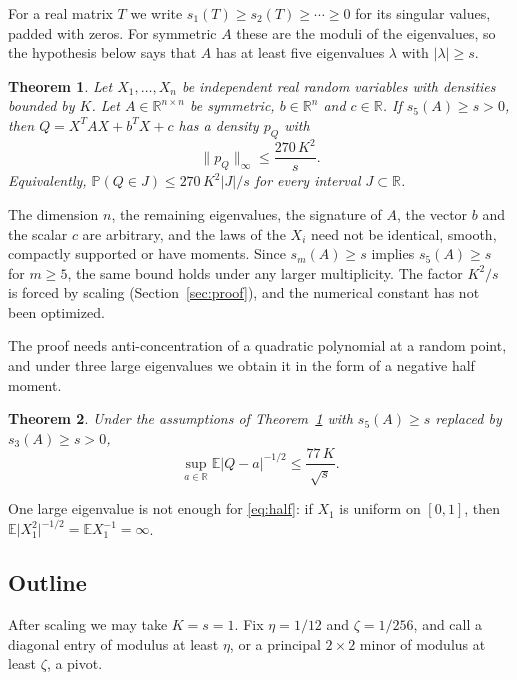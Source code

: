 \documentclass[11pt]{amsart}
\numberwithin{equation}{section}
\newtheorem{theorem}{Theorem}[section]
\theoremstyle{definition}
\theoremstyle{remark}
\newcommand{\R}{\mathbb R}
\newcommand{\E}{\mathbb E}
\newcommand{\PP}{\mathbb P}
\newcommand{\1}{\mathbf 1}
\newcommand{\norm}[1]{\lVert #1\rVert}
\newcommand{\abs}[1]{\lvert #1\rvert}
\begin{document}
For a real matrix $T$ we write $s_1(T)\ge s_2(T)\ge\cdots\ge0$ for its singular values, padded with zeros. For symmetric $A$ these are the moduli of the eigenvalues, so the hypothesis below says that $A$ has at least five eigenvalues $\lambda$ with $\abs\lambda\ge s$.

\begin{theorem}\label{thm:main}
Let $X_1,\dots,X_n$ be independent real random variables with densities bounded by $K$. Let $A\in\R^{n\times n}$ be symmetric, $b\in\R^n$ and $c\in\R$. If $s_5(A)\ge s>0$, then $Q=X^TAX+b^TX+c$ has a density $p_Q$ with
\begin{equation}\label{eq:main}
\norm{p_Q}_\infty\le \frac{270\,K^2}{s}.
\end{equation}
Equivalently, $\PP(Q\in J)\le 270\,K^2\abs J/s$ for every interval $J\subset\R$.
\end{theorem}

The dimension $n$, the remaining eigenvalues, the signature of $A$, the vector $b$ and the scalar $c$ are arbitrary, and the laws of the $X_i$ need not be identical, smooth, compactly supported or have moments. Since $s_m(A)\ge s$ implies $s_5(A)\ge s$ for $m\ge5$, the same bound holds under any larger multiplicity. The factor $K^2/s$ is forced by scaling (Section~\ref{sec:proof}), and the numerical constant has not been optimized.

The proof needs anti-concentration of a quadratic polynomial at a random point, and under three large eigenvalues we obtain it in the form of a negative half moment.

\begin{theorem}\label{thm:half}
Under the assumptions of Theorem~\ref{thm:main} with $s_5(A)\ge s$ replaced by $s_3(A)\ge s>0$,
\begin{equation}\label{eq:half}
\sup_{a\in\R}\E\abs{Q-a}^{-1/2}\le\frac{77\,K}{\sqrt s}.
\end{equation}
\end{theorem}

One large eigenvalue is not enough for \eqref{eq:half}: if $X_1$ is uniform on $[0,1]$, then $\E\abs{X_1^2}^{-1/2}=\E X_1^{-1}=\infty$.

\subsection*{Outline}
After scaling we may take $K=s=1$. Fix $\eta=1/12$ and $\zeta=1/256$, and call a diagonal entry of modulus at least $\eta$, or a principal $2\times2$ minor of modulus at least $\zeta$, a pivot.
\end{document}
